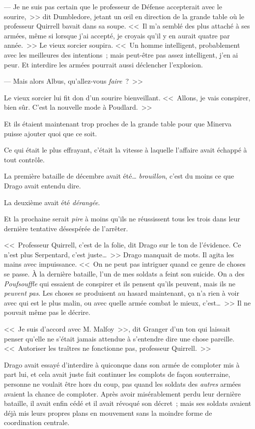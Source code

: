 --- Je ne suis pas certain que le professeur de Défense accepterait avec le sourire,~>> dit Dumbledore, jetant un œil en direction de la grande table où le professeur Quirrell bavait dans sa soupe. <<~Il m'a semblé des plus attaché à ses armées, même si lorsque j'ai accepté, je croyais qu'il y en aurait quatre par année.~>> Le vieux sorcier soupira. <<~Un homme intelligent, probablement avec les meilleures des intentions~; mais peut-être pas assez intelligent, j'en ai peur. Et interdire les armées pourrait aussi déclencher l'explosion.

--- Mais alors Albus, qu'allez-vous \emph{faire}~?~>>

Le vieux sorcier lui fit don d'un sourire bienveillant. <<~Allons, je vais conspirer, bien sûr. C'est la nouvelle mode à Poudlard.~>>

Et ils étaient maintenant trop proches de la grande table pour que Minerva puisse ajouter quoi que ce soit.

\later

Ce qui était le plus effrayant, c'était la vitesse à laquelle l'affaire avait échappé à tout contrôle.

La première bataille de décembre avait été… \emph{brouillon}, c'est du moins ce que Drago avait entendu dire.

La deuxième avait été \emph{dérangée}.

Et la prochaine serait \emph{pire} à moins qu'ils ne réussissent tous les trois dans leur dernière tentative désespérée de l'arrêter.

<<~Professeur Quirrell, c'est de la folie, dit Drago sur le ton de l'évidence. Ce n'est plus Serpentard, c'est juste…~>> Drago manquait de mots. Il agita les mains avec impuissance. <<~On ne peut pas intriguer quand ce genre de choses se passe. À la dernière bataille, l'un de mes soldats a feint son suicide. On a des \emph{Poufsouffle} qui essaient de conspirer et ils pensent qu'ils peuvent, mais ils ne \emph{peuvent pas}. Les choses se produisent au hasard maintenant, ça n'a rien à voir avec qui est le plus malin, ou avec quelle armée combat le mieux, c'est…~>> Il ne pouvait même pas le décrire.

<<~Je suis d'accord avec M. Malfoy~>>, dit Granger d'un ton qui laissait penser qu'elle ne s'était jamais attendue à s'entendre dire une chose pareille. <<~Autoriser les traîtres ne fonctionne pas, professeur Quirrell.~>>

Drago avait essayé d'interdire à quiconque dans son armée de comploter mis à part lui, et cela avait juste fait continuer les complots de façon souterraine, personne ne voulait être hors du coup, pas quand les soldats des \emph{autres} armées avaient la chance de comploter. Après avoir misérablement perdu leur dernière bataille, il avait enfin cédé et il avait révoqué son décret~; mais ses soldats avaient déjà mis leurs propres plans en mouvement sans la moindre forme de coordination centrale.

